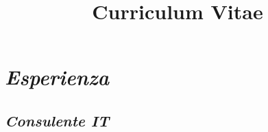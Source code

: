 \documentclass[11pt,a4paper,sans]{moderncv} %
\title{Curriculum Vitae}
\newif\ifen
\newif\ifit
\newcommand{\en}[1]{\ifen#1\fi}
\newcommand{\it}[1]{\ifit#1\fi}
\begin{document}


%
%
%
%
%


\makecvtitle %




\section{\en{Experience}\it{Esperienza}}

\subsection{\en{IT Consultant}\it{Consulente IT}}
\end{document}
